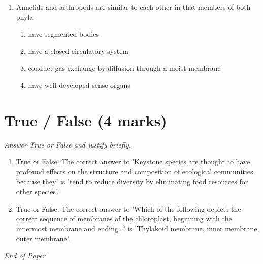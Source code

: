\documentclass[12pt]{article}
\begin{document}
\begin{enumerate}[label=\arabic*.]
\begin{enumerate}[label=(\alph*)]
    \item eyespot
    \item simple eye
    \item compound eye
    \item binocular eye
\end{enumerate}
\item Annelids and arthropods are similar to each other in that members of both phyla
\begin{enumerate}[label=(\alph*)]
    \item have segmented bodies
    \item have a closed circulatory system
    \item conduct gas exchange by diffusion through a moist membrane
    \item have well-developed sense organs
\end{enumerate}
\end{enumerate}

\section*{True / False (4 marks)}
\textit{Answer True or False and justify briefly.}
\begin{enumerate}[label=\arabic*.]
\item True or False: The correct answer to 'Keystone species are thought to have profound effects on the structure and composition of ecological communities because they' is 'tend to reduce diversity by eliminating food resources for other species'.
\item True or False: The correct answer to 'Which of the following depicts the correct sequence of membranes of the chloroplast, beginning with the innermost membrane and ending...' is 'Thylakoid membrane, inner membrane, outer membrane'.
\end{enumerate}

\vfill
\noindent\textit{End of Paper}
\end{document}
